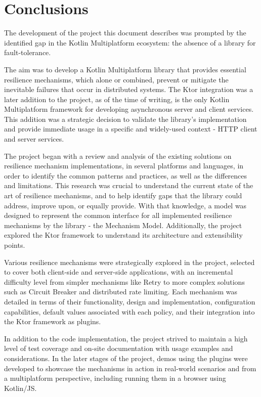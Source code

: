 \chapter{Conclusions}\label{ch:conclusions}

The development of the project
this document describes was prompted by the identified gap in the Kotlin Multiplatform ecosystem:
the absence of a library for fault-tolerance.

The aim was to develop a Kotlin Multiplatform library
that provides essential resilience mechanisms, which alone or combined, prevent or mitigate the inevitable failures that occur in distributed systems.
The Ktor integration was a later addition to the project, as of the time of writing,
is the only Kotlin Multiplatform framework for developing asynchronous server and client services.
This addition was a strategic decision to validate the library's implementation and provide immediate usage in a specific and widely-used context - HTTP client and server services.

The project began with a review and analysis
of the existing solutions on resilience mechanism implementations,
in several platforms and languages,
in order to identify the common patterns and practices, as well as the differences and limitations.
This research was crucial to understand the current state of the art of resilience mechanisms,
and to help identify gaps that the library could address, improve upon, or equally provide.
With that knowledge,
a model was designed to represent the common interface for all implemented resilience mechanisms by the library -
the Mechanism Model.
Additionally, the project explored the Ktor framework to understand its architecture and extensibility points.

Various resilience mechanisms were strategically explored in the project,
selected to cover both client-side and server-side applications,
with an incremental difficulty level from simpler mechanisms like Retry to more complex solutions such as Circuit Breaker and distributed rate limiting.
Each mechanism was detailed in terms of their functionality, design and implementation, configuration capabilities, default values associated with each policy, and their integration into the Ktor framework as plugins.

In addition to the code implementation,
the project strived
to maintain a high level of test coverage and on-site documentation with usage examples and considerations.
In the later stages of the project,
demos using the plugins were developed
to showcase the mechanisms in action in real-world scenarios and from a multiplatform perspective,
including running them in a browser using Kotlin/JS.

